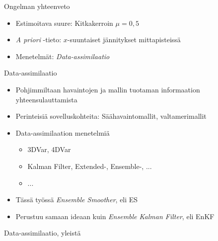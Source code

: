 \documentclass{beamer}
\begin{document}
\begin{frame}{Ongelman yhteenveto}

\begin{itemize}
\item Estimoitava suure: Kitkakerroin $\mu=0{,}5$
\item \emph{A priori} -tieto: $x$-suuntaiset jännitykset mittapisteissä
\item Menetelmät: \emph{Data-assimilaatio}
\end{itemize}

\end{frame}

\begin{frame}{Data-assimilaatio}

\begin{itemize}
\item Pohjimmiltaan havaintojen ja mallin tuotaman informaation yhteensulauttamista
\item Perinteisiä sovelluskohteita: Säähavaintomallit, valtamerimallit
\item Data-assimilaation menetelmiä
\begin{itemize}
\item 3DVar, 4DVar
\item Kalman Filter, Extended-, Ensemble-, ...
\item ...
\end{itemize}
\item Tässä työssä \emph{Ensemble Smoother}, eli ES
\item Perustuu samaan ideaan kuin \emph{Ensemble Kalman Filter}, eli EnKF
\end{itemize}

\end{frame}

\begin{frame}{Data-assimilaatio, yleistä}

\end{frame}
\end{document}
